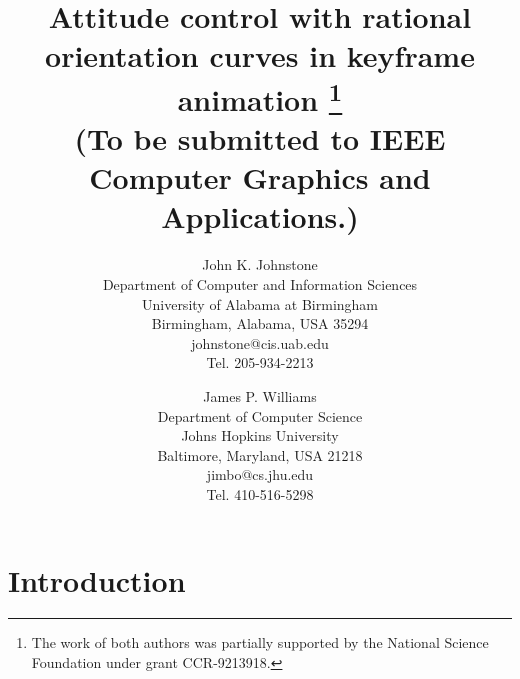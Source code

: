 \newtheorem{rmk}{Remark}[section]
\newtheorem{example}{Example}[section]
\newtheorem{conjecture}{Conjecture}[section]
\newtheorem{claim}{Claim}[section]
\newtheorem{notation}{Notation}[section]
\newtheorem{lemma}{Lemma}[section]
\newtheorem{theorem}{Theorem}[section]
\newtheorem{corollary}{Corollary}[section]
\newtheorem{defn2}{Definition}


\setlength{\oddsidemargin}{0pt}
\setlength{\topmargin}{-.25in}	%
\setlength{\headsep}{0pt}
\setlength{\textheight}{8.75in}
\setlength{\textwidth}{6.5in}
\setlength{\columnsep}{5mm}		%

\title{Attitude control with rational orientation curves in keyframe animation
        \thanks{The work of both authors was partially supported 
	by the National Science Foundation under grant CCR-9213918.}\\
	(To be submitted to IEEE Computer Graphics and Applications.)}
\author{John K. Johnstone\\
	Department of Computer and Information Sciences\\
	University of Alabama at Birmingham\\
	Birmingham, Alabama, USA 35294\\
	johnstone@cis.uab.edu\\
	Tel. 205-934-2213
	\and 
	James P. Williams\\
	Department of Computer Science\\
	Johns Hopkins University\\
	Baltimore, Maryland, USA 21218\\
	jimbo@cs.jhu.edu\\
	Tel. 410-516-5298}



\maketitle
\tableofcontents


\section{Introduction}

